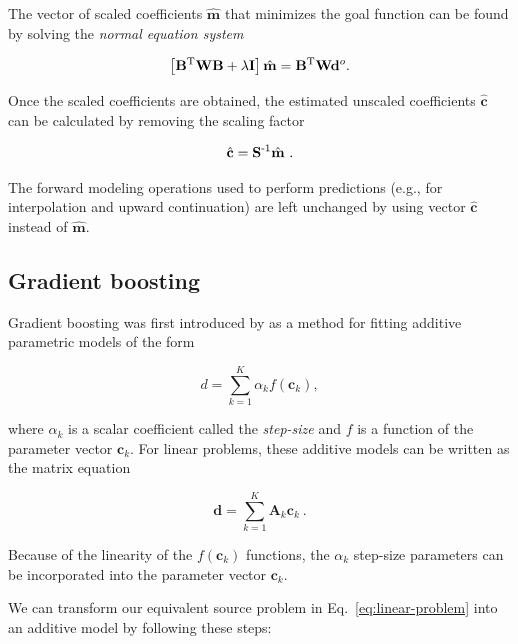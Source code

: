 The vector of scaled coefficients $\hat{\mathbf{m}}$ that minimizes the goal
function can be found by solving the \emph{normal equation system}
\citep{menke1989}

\begin{equation}
    \left[
      \mathbf{B}^{\text{T}} \mathbf{W} \mathbf{B} + \lambda \mathbf{I}
    \right]
    \hat{\mathbf{m}} =
    \mathbf{B}^{\text{T}}\mathbf{W}
    \mathbf{d}^o.
    \label{eq:least_squares_solution}
\end{equation}

Once the scaled coefficients are obtained, the estimated unscaled coefficients
$\hat{\mathbf{c}}$ can be calculated by removing the scaling factor

\begin{equation}
    \hat{\mathbf{c}} = \mathbf{S}^{\text{-}1} \hat{\mathbf{m}} \ .
\end{equation}

\noindent The forward modeling operations used to perform predictions
(e.g., for interpolation and upward continuation) are left unchanged by
using vector $\hat{\mathbf{c}}$ instead of $\hat{\mathbf{m}}$.


\subsection{Gradient boosting}

Gradient boosting was first introduced by \citet{friedman2001, friedman2002} as
a method for fitting additive parametric models of the form

\begin{equation}
    d = \sum_{k=1}^K \alpha_k f(\mathbf{c}_k),
\end{equation}

\noindent where $\alpha_k$ is a scalar coefficient called the \emph{step-size}
and $f$ is a function of the parameter vector $\mathbf{c}_k$.
For linear problems, these additive models can be written as the matrix
equation

\begin{equation}
    \mathbf{d} = \sum_{k=1}^K \mathbf{A}_k \mathbf{c}_k \ .
    \label{eq:gb-linear-model}
\end{equation}

\noindent Because of the linearity of the $f(\mathbf{c}_k)$ functions, the
$\alpha_k$ step-size parameters can be incorporated into the parameter vector
$\mathbf{c}_k$.

We can transform our equivalent source problem in
Eq.~\ref{eq:linear-problem} into an additive model by following these
steps:

